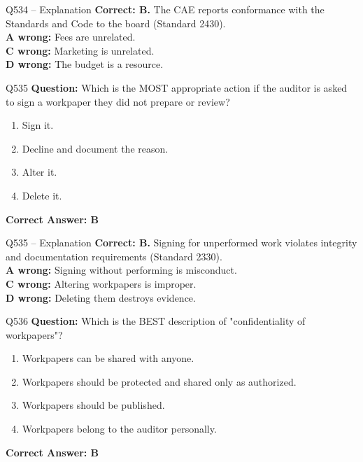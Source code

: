 \documentclass[aspectratio=169,10pt]{beamer}
\begin{document}
	\begin{frame}[t]{Q534 -- Explanation}
		\small
		\textbf{Correct: B.} The CAE reports conformance with the Standards and Code to the board (Standard 2430). \\[4pt]
		\textbf{A wrong:} Fees are unrelated. \\[2pt]
		\textbf{C wrong:} Marketing is unrelated. \\[2pt]
		\textbf{D wrong:} The budget is a resource.
	\end{frame}
	
	\begin{frame}[t]{Q535}
		\small
		\textbf{Question:} Which is the MOST appropriate action if the auditor is asked to sign a workpaper they did not prepare or review?
		\begin{enumerate}[label=\Alph*.,itemsep=1pt,topsep=2pt]
			\item Sign it.
			\item Decline and document the reason.
			\item Alter it.
			\item Delete it.
		\end{enumerate}
		\vspace{4pt}
		\textbf{Correct Answer: B}
	\end{frame}
	
	\begin{frame}[t]{Q535 -- Explanation}
		\small
		\textbf{Correct: B.} Signing for unperformed work violates integrity and documentation requirements (Standard 2330). \\[4pt]
		\textbf{A wrong:} Signing without performing is misconduct. \\[2pt]
		\textbf{C wrong:} Altering workpapers is improper. \\[2pt]
		\textbf{D wrong:} Deleting them destroys evidence.
	\end{frame}
	
	\begin{frame}[t]{Q536}
		\small
		\textbf{Question:} Which is the BEST description of "confidentiality of workpapers"?
		\begin{enumerate}[label=\Alph*.,itemsep=1pt,topsep=2pt]
			\item Workpapers can be shared with anyone.
			\item Workpapers should be protected and shared only as authorized.
			\item Workpapers should be published.
			\item Workpapers belong to the auditor personally.
		\end{enumerate}
		\vspace{4pt}
		\textbf{Correct Answer: B}
	\end{frame}
	
\end{document}
